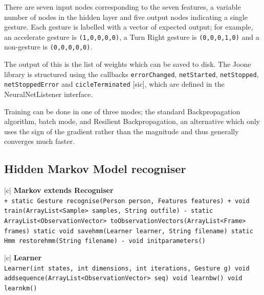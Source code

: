 \documentclass[12pt,a4,notitlepage]{report}
\renewcommand{\_}{\texttt{\symbol{95}}}
\newcommand{\<}{\texttt{\symbol{60}}}
\renewcommand{\>}{\texttt{\symbol{62}}}
\newcommand{\class}[1]{\textbf{#1}}
\newcommand{\variable}[1]{\texttt{#1}}
\begin{document}
There are seven input nodes corresponding to the seven features, a variable number of nodes in the hidden layer and five output nodes indicating a single gesture. Each gesture is labelled with a vector of expected output; for example, an accelerate gesture is \variable{(1,0,0,0,0)}, a Turn Right gesture is \variable{(0,0,0,1,0)} and a non-gesture is \variable{(0,0,0,0,0)}.

The output of this is the list of weights which can be saved to disk. The Joone library is structured using the callbacks \variable{errorChanged}, \variable{netStarted}, \variable{netStopped}, \variable{netStoppedError} and \variable{cicleTerminated} [sic], which are defined in the NeuralNetListener interface.

Training can be done in one of three modes; the standard Backpropagation algorithm, batch mode, and Resilient Backpropagation, an alternative which only uses the sign of the gradient rather than the magnitude and thus generally converges much faster.

\newpage

\subsection{Hidden Markov Model recogniser}

\begin{tabular}{|c|} \hline 
\class{Markov extends Recogniser} \\ \hline
{}
{ \variable{+ static Gesture recognise(Person person, Features features) \newline
+ void train(ArrayList<Sample> samples, String out\_file) \newline
- static ArrayList<ObservationVector> toObservationVectors(ArrayList<Frame> frames) \newline
static void save\_hmm(Learner learner, String filename) \newline
static Hmm restore\_hmm(String filename) \newline
- void init\_parameters()
} } \\ \hline
\end{tabular}

\begin{tabular}{|c|} \hline 
\class{Learner} \\ \hline
{}
{ \variable{Learner(int states, int dimensions, int iterations, Gesture g) \newline
void add\_sequence(ArrayList<ObservationVector> seq) \newline
void learnbw() \newline
void learnkm()
} } \\ \hline
\end{tabular}
\end{document}
